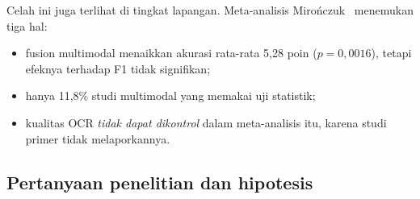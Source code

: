 \documentclass[11pt,a4paper]{article}
\begin{document}
\noindent Celah ini juga terlihat di tingkat lapangan. Meta-analisis
Miro\'nczuk~\cite{mironczuk2026} menemukan tiga hal:
\begin{itemize}
  \item fusion multimodal menaikkan akurasi rata-rata 5,28 poin ($p = 0{,}0016$), tetapi
  efeknya terhadap F1 tidak signifikan;
  \item hanya 11,8\% studi multimodal yang memakai uji statistik;
  \item kualitas OCR \textit{tidak dapat dikontrol} dalam meta-analisis itu, karena studi
  primer tidak melaporkannya.
\end{itemize}

\medskip
\noindent{}

\subsection{Pertanyaan penelitian dan hipotesis}
\end{document}
